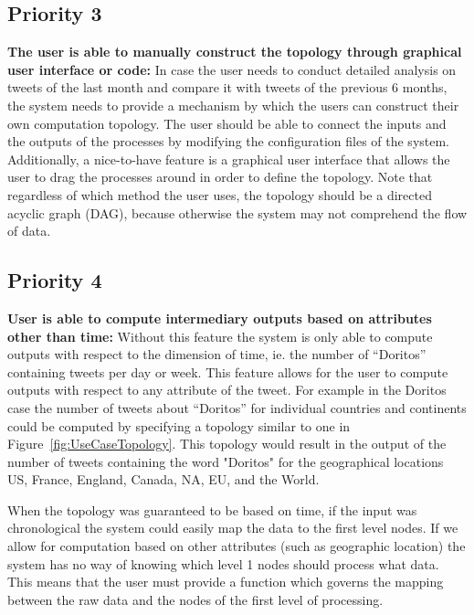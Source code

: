 \documentclass[a4paper]{article}
\begin{document}
\subsection{Priority 3}
{\bf The user is able to manually construct the topology through graphical user interface or code:} In case the user needs to conduct detailed analysis on tweets of the last month and compare it with tweets of the previous 6 months, the system needs to provide a mechanism by which the users can construct their own computation topology. The user should be able to connect the inputs and the outputs of the processes by modifying the configuration files of the system. Additionally, a nice-to-have feature is a graphical user interface that allows the user to drag the processes around in order to define the topology. Note that regardless of which method the user uses, the topology should be a directed acyclic graph (DAG), because otherwise the system may not comprehend the flow of data.

\subsection{Priority 4}
{\bf User is able to compute intermediary outputs based on attributes other than time:}  Without this feature the system is only able to compute outputs with respect to the dimension of time, ie. the number of “Doritos” containing tweets per day or week.  This feature allows for the user to compute outputs with respect to any attribute of the tweet.  For example in the Doritos case the number of tweets about “Doritos” for individual countries and continents could be computed by specifying a topology similar to one in Figure~\ref{fig:UseCaseTopology}.  This topology would result in the output of the number of tweets containing the word "Doritos" for the geographical locations US, France, England, Canada, NA, EU, and the World.  

When the topology was guaranteed to be based on time, if the input was chronological the system could easily map the data to the first level nodes.  If we allow for computation based on other attributes (such as geographic location) the system has no way of knowing which level 1 nodes should process what data.  This means that the user must provide a function which governs the mapping between the raw data and the nodes of the first level of processing.  
\end{document}
